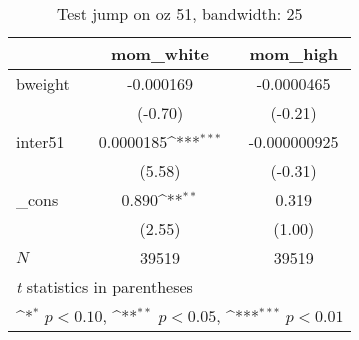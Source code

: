 \begin{table}[htbp]\centering
\def\sym#1{\ifmmode^{#1}\else\(^{#1}\)\fi}
\caption{Test jump on oz 51, bandwidth: 25}
\begin{tabular}{l*{2}{c}}
\hline\hline
            &\multicolumn{1}{c}{mom\_white}&\multicolumn{1}{c}{mom\_high}\\
\hline
bweight     &   -0.000169         &  -0.0000465         \\
            &     (-0.70)         &     (-0.21)         \\
[1em]
inter51     &   0.0000185\sym{***}&-0.000000925         \\
            &      (5.58)         &     (-0.31)         \\
[1em]
\_cons      &       0.890\sym{**} &       0.319         \\
            &      (2.55)         &      (1.00)         \\
\hline
\(N\)       &       39519         &       39519         \\
\hline\hline
\multicolumn{3}{l}{\footnotesize \textit{t} statistics in parentheses}\\
\multicolumn{3}{l}{\footnotesize \sym{*} \(p<0.10\), \sym{**} \(p<0.05\), \sym{***} \(p<0.01\)}\\
\end{tabular}
\end{table}
